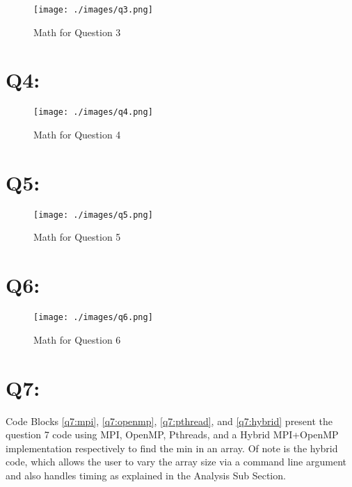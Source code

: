 \documentclass[11pt]{article}
\begin{document}
\begin{figure}[H]
\centering
    \texttt{[image: ./images/q3.png]}
\caption{Math for Question 3}
\label{fig:q3}
\end{figure}

\newpage

\section*{Q4:}

\begin{figure}[H]
\centering
    \texttt{[image: ./images/q4.png]}
\caption{Math for Question 4}
\label{fig:q4}
\end{figure}

\newpage

\section*{Q5:}

\begin{figure}[H]
\centering
    \texttt{[image: ./images/q5.png]}
\caption{Math for Question 5}
\label{fig:q5}
\end{figure}

\newpage

\section*{Q6:}

\begin{figure}[H]
\centering
    \texttt{[image: ./images/q6.png]}
\caption{Math for Question 6}
\label{fig:q6}
\end{figure}

\newpage


\section*{Q7:}

Code Blocks \ref{q7:mpi}, \ref{q7:openmp}, \ref{q7:pthread}, and \ref{q7:hybrid} present the question 7 code using MPI, OpenMP, Pthreads, and a Hybrid MPI+OpenMP implementation respectively to find the min in an array.
Of note is the hybrid code, which allows the user to vary the array size via a command line argument and also handles timing as explained in the Analysis Sub Section.





\end{document}
